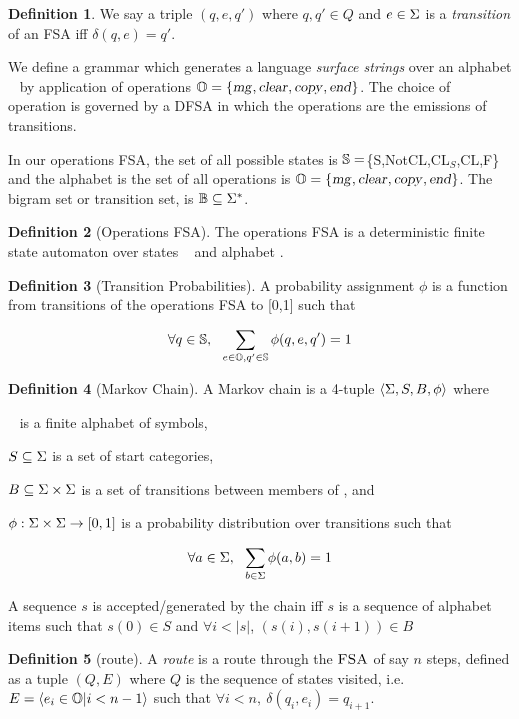 \documentclass[12pt]{article}
\theoremstyle{definition}
\newtheorem{definition}{Definition}[section]
\begin{document}
\begin{definition}
  We say a triple $(q,e,q')$ where $q,q'\in Q$ and $e\in\Sigma$ is a \textit{transition} of an
  FSA iff $\delta(q,e)=q'$.
\end{definition}

We define a grammar which generates a language \textit{surface strings} over an alphabet \sg~ by application of operations $\mathbb{O}=\{\text{\textsl{mg}},\text{\textsl{clear}},\text{\textsl{copy}},\text{\textsl{end}}\}$. The choice of operation is governed by a DFSA in which the operations are the emissions of transitions.

In our operations FSA, the set of all possible states is $\mathbb{S}=$\{S,NotCL,CL$_S$,CL,F\} and the alphabet is the set of all operations is $\mathbb{O}=\{\text{\textsl{mg}},\text{\textsl{clear}},\text{\textsl{copy}},\text{\textsl{end}}\}$. The bigram set or transition set, is $\mathbb{B}\subseteq\Sigma^*$.


\begin{definition}[Operations FSA]
  The operations FSA is a deterministic finite state automaton over states \STATES~ and alphabet \OPS.
\end{definition}

\begin{definition}[Transition Probabilities]
   
  A probability assignment $\phi$ is a function from transitions of the operations FSA to [0,1] such that

$$\forall q\in \mathbb{S},~~\sum_{e\in\mathbb{O},q'\in \mathbb{S}} \phi(q,e,q') = 1 $$

\end{definition}

\begin{definition}[Markov Chain]
  A Markov chain is a 4-tuple $\langle \Sigma, S, B, \phi  \rangle $ where 

\sg~ is a finite alphabet of symbols, 

$S\subseteq \Sigma$ is a set of start categories,
 
$B\subseteq \Sigma\times\Sigma$ is a set of transitions between members of \sg, and

$\phi: \Sigma \times \Sigma \rightarrow [0,1]$ is a probability distribution over transitions such that

$$\forall a\in \Sigma,~~\sum_{b\in\Sigma} \phi(a,b) = 1 $$


A sequence $s$ is accepted/generated by the chain iff $s$ is a sequence of alphabet items such that $s(0) \in S$ and $\forall i<|s|$, $(s(i),s(i+1))\in B$ 

\end{definition}

\begin{definition}[route]
  A \emph{route} is a route through the $\textsc{FSA}$ of say $n$ steps, defined as a tuple $(Q,E)$ where $Q$ is the sequence of states visited, i.e.
 $E=\langle e_i\in\mathbb{O}|i<n-1\rangle$ such that $\forall i<n,~ \delta(q_i,e_i)=q_{i+1}$.

\end{definition}
\end{document}
